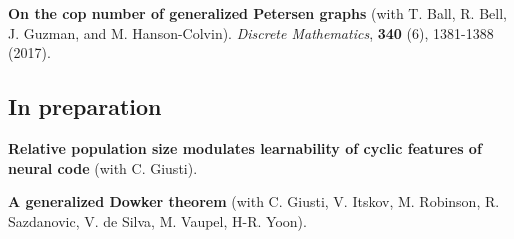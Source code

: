 \documentclass[10pt,letterpaper]{article}
\renewenvironment{itemize}{
  \begin{list}{}{
    \setlength{\leftmargin}{1.5em}
    \setlength{\itemsep}{0.25em}
    \setlength{\parskip}{0pt}
    \setlength{\parsep}{0.25em}
  }
}{
  \end{list}
}
\begin{document}
\begin{itemize}
\item {\bf On the cop number of generalized Petersen graphs} (with T. Ball, R. Bell, J. Guzman, and M. Hanson-Colvin). \textit{Discrete Mathematics}, \textbf{340} (6), 1381-1388 (2017). 


\subsection*{In preparation}

\item{\bf Relative population size modulates learnability of cyclic features of neural code} (with C. Giusti).


\item {\bf A generalized Dowker theorem} (with C. Giusti, V. Itskov, M. Robinson, R. Sazdanovic, V. de Silva, M. Vaupel, H-R. Yoon).

\end{itemize}

\end{document}

